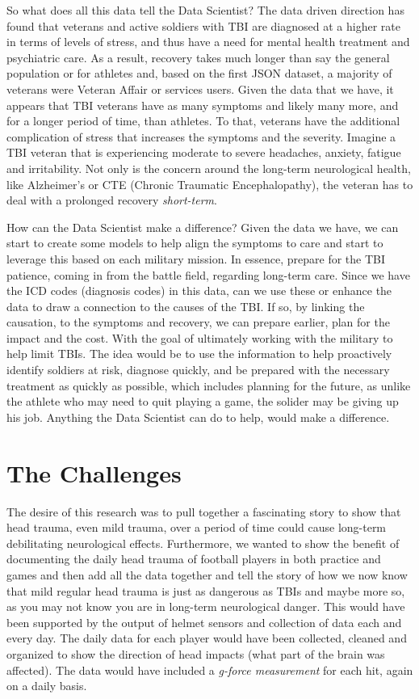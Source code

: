 \documentclass[sigconf]{acmart}
\begin{document}
So what does all this data tell the Data Scientist?  The data driven direction has found that veterans and active soldiers with TBI are diagnosed at a higher rate in terms of levels of stress, and thus have a need for mental health treatment and psychiatric care.  As a result, recovery takes much longer than say the general population or for athletes and, based on the first JSON dataset, a majority of veterans were Veteran Affair or services users.  Given the data that we have, it appears that TBI veterans have as many symptoms and likely many more, and for a longer period of time, than athletes.  To that, veterans have the additional complication of stress that increases the symptoms and the severity.  Imagine a TBI veteran that is experiencing moderate to severe headaches, anxiety, fatigue and irritability.  Not only is the concern around the long-term neurological health, like Alzheimer's or CTE (Chronic Traumatic Encephalopathy), the veteran has to deal with a prolonged recovery {\em short-term}.  

How can the Data Scientist make a difference?  Given the data we have, we can start to create some models to help align the symptoms to care and start to leverage this based on each military mission.  In essence, prepare for the TBI patience, coming in from the battle field, regarding long-term care.  Since we have the ICD codes (diagnosis codes) in this data, can we use these or enhance the data to draw a connection to the causes of the TBI.  If so, by linking the causation, to the symptoms and recovery, we can prepare earlier, plan for the impact and the cost.  With the goal of ultimately working with the military to help limit TBIs.  The idea would be to use the information to help proactively identify soldiers at risk, diagnose quickly, and be prepared with the necessary treatment as quickly as possible, which includes planning for the future, as unlike the athlete who may need to quit playing a game, the solider may be giving up his job.  Anything the Data Scientist can do to help, would make a difference.


\section{The Challenges}

The desire of this research was to pull together a fascinating story to show that head trauma, even mild trauma, over a period of time could cause long-term debilitating neurological effects.  Furthermore, we wanted to show the benefit of documenting the daily head trauma of football players in both practice and games and then add all the data together and tell the story of how we now know that mild regular head trauma is just as dangerous as TBIs and maybe more so, as you may not know you are in long-term neurological danger.  This would have been supported by the output of helmet sensors and collection of data each and every day.  The daily data for each player would have been collected, cleaned and organized to show the direction of head impacts (what part of the brain was affected).  The data would have included a {\em g-force measurement} for each hit, again on a daily basis. 
\end{document}
